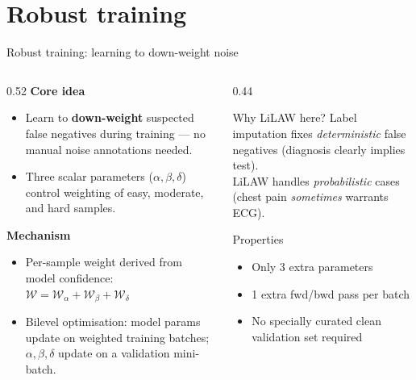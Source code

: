 \documentclass[aspectratio=169]{beamer}
\begin{document}
\section{Robust training}

\begin{frame}{Robust training: learning to down-weight noise}
  \begin{columns}[T]
    \begin{column}{0.52\textwidth}
      \textbf{Core idea}
      \begin{itemize}
        \item Learn to \textbf{down-weight} suspected false negatives
              during training --- no manual noise annotations needed.
        \item Three scalar parameters ($\alpha, \beta, \delta$) control
              weighting of easy, moderate, and hard samples.
      \end{itemize}

      \vspace{0.6em}
      \textbf{Mechanism}
      \begin{itemize}
        \item Per-sample weight derived from model confidence:\\
              $\mathcal{W} = \mathcal{W}_\alpha + \mathcal{W}_\beta + \mathcal{W}_\delta$
        \item Bilevel optimisation: model params update on
              weighted training batches; $\alpha, \beta, \delta$ update
              on a validation mini-batch.
      \end{itemize}
    \end{column}
    \begin{column}{0.44\textwidth}
      \begin{block}{Why LiLAW here?}
        \small
        Label imputation fixes \emph{deterministic} false negatives
        (diagnosis clearly implies test).\\[0.4em]
        LiLAW handles \emph{probabilistic} cases
        (chest pain \emph{sometimes} warrants ECG).
      \end{block}

      \vspace{0.5em}
      \begin{block}{Properties}
        \small
        \begin{itemize}
          \item Only 3 extra parameters
          \item 1 extra fwd/bwd pass per batch
          \item No specially curated clean validation set required
        \end{itemize}
      \end{block}
    \end{column}
  \end{columns}
\end{frame}
\end{document}
